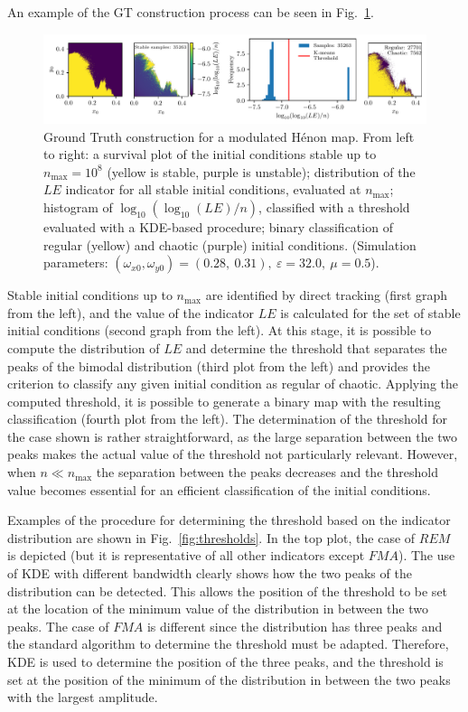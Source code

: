 An example of the GT construction process can be seen in Fig.~\ref{fig:ground_truth_2}. 
%
\begin{figure}[htp]
    \centering
    \includegraphics[width=1.0\textwidth]{6_dynamic_indicators/fig/GT.pdf}
    \caption{Ground Truth construction for a modulated Hénon map. From left to right: a survival plot of the initial conditions stable up to $n_\text{max}=10^8$ (yellow is stable, purple is unstable); distribution of the $LE$ indicator for all stable initial conditions, evaluated at $n_\text{max}$; histogram of $\log_{10}(\log_{10}(LE)/n)$, classified with a threshold evaluated with a KDE-based procedure; binary classification of regular (yellow) and chaotic (purple) initial conditions. (Simulation parameters:  $(\omega_{x0},\omega_{y0})= (0.28,\ 0.31),\ \varepsilon=32.0,\ \mu=0.5$).}
    \label{fig:ground_truth_2}
\end{figure}
%
Stable initial conditions up to $n_\mathrm{max}$ are identified by direct tracking (first graph from the left), and the value of the indicator $LE$ is calculated for the set of stable initial conditions (second graph from the left). At this stage, it is possible to compute the distribution of $LE$ and determine the threshold that separates the peaks of the bimodal distribution (third plot from the left) and provides the criterion to classify any given initial condition as regular of chaotic. Applying the computed threshold, it is possible to generate a binary map with the resulting classification (fourth plot from the left). The determination of the threshold for the case shown is rather straightforward, as the large separation between the two peaks makes the actual value of the threshold not particularly relevant. However, when $n \ll n_\mathrm{max}$ the separation between the peaks decreases and the threshold value becomes essential for an efficient classification of the initial conditions. 

Examples of the procedure for determining the threshold based on the indicator distribution are shown in Fig.~\ref{fig:thresholds}. In the top plot, the case of $REM$ is depicted (but it is representative of all other indicators except $FMA$). The use of KDE with different bandwidth clearly shows how the two peaks of the distribution can be detected. This allows the position of the threshold to be set at the location of the minimum value of the distribution in between the two peaks. The case of $FMA$ is different since the distribution has three peaks and the standard algorithm to determine the threshold must be adapted. Therefore, KDE is used to determine the position of the three peaks, and the threshold is set at the position of the minimum of the distribution in between the two peaks with the largest amplitude.  

